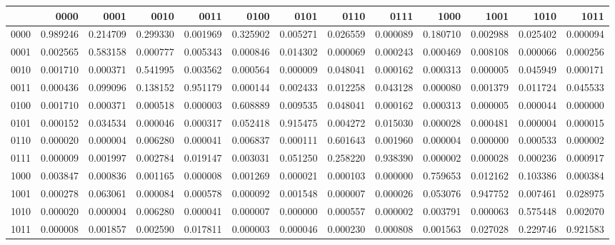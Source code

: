 \begin{tabular}{lrrrrrrrrrrrr}
\toprule
 & 0000 & 0001 & 0010 & 0011 & 0100 & 0101 & 0110 & 0111 & 1000 & 1001 & 1010 & 1011 \\
\midrule
0000 & 0.989246 & 0.214709 & 0.299330 & 0.001969 & 0.325902 & 0.005271 & 0.026559 & 0.000089 & 0.180710 & 0.002988 & 0.025402 & 0.000094 \\
0001 & 0.002565 & 0.583158 & 0.000777 & 0.005343 & 0.000846 & 0.014302 & 0.000069 & 0.000243 & 0.000469 & 0.008108 & 0.000066 & 0.000256 \\
0010 & 0.001710 & 0.000371 & 0.541995 & 0.003562 & 0.000564 & 0.000009 & 0.048041 & 0.000162 & 0.000313 & 0.000005 & 0.045949 & 0.000171 \\
0011 & 0.000436 & 0.099096 & 0.138152 & 0.951179 & 0.000144 & 0.002433 & 0.012258 & 0.043128 & 0.000080 & 0.001379 & 0.011724 & 0.045533 \\
0100 & 0.001710 & 0.000371 & 0.000518 & 0.000003 & 0.608889 & 0.009535 & 0.048041 & 0.000162 & 0.000313 & 0.000005 & 0.000044 & 0.000000 \\
0101 & 0.000152 & 0.034534 & 0.000046 & 0.000317 & 0.052418 & 0.915475 & 0.004272 & 0.015030 & 0.000028 & 0.000481 & 0.000004 & 0.000015 \\
0110 & 0.000020 & 0.000004 & 0.006280 & 0.000041 & 0.006837 & 0.000111 & 0.601643 & 0.001960 & 0.000004 & 0.000000 & 0.000533 & 0.000002 \\
0111 & 0.000009 & 0.001997 & 0.002784 & 0.019147 & 0.003031 & 0.051250 & 0.258220 & 0.938390 & 0.000002 & 0.000028 & 0.000236 & 0.000917 \\
1000 & 0.003847 & 0.000836 & 0.001165 & 0.000008 & 0.001269 & 0.000021 & 0.000103 & 0.000000 & 0.759653 & 0.012162 & 0.103386 & 0.000384 \\
1001 & 0.000278 & 0.063061 & 0.000084 & 0.000578 & 0.000092 & 0.001548 & 0.000007 & 0.000026 & 0.053076 & 0.947752 & 0.007461 & 0.028975 \\
1010 & 0.000020 & 0.000004 & 0.006280 & 0.000041 & 0.000007 & 0.000000 & 0.000557 & 0.000002 & 0.003791 & 0.000063 & 0.575448 & 0.002070 \\
1011 & 0.000008 & 0.001857 & 0.002590 & 0.017811 & 0.000003 & 0.000046 & 0.000230 & 0.000808 & 0.001563 & 0.027028 & 0.229746 & 0.921583 \\
\bottomrule
\end{tabular}
